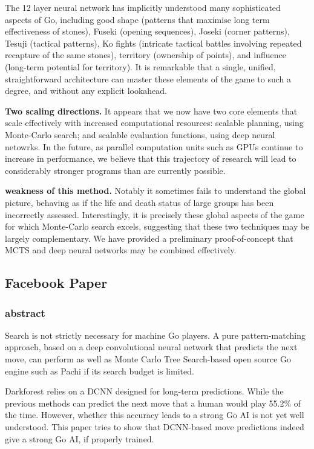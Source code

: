 The 12 layer neural network has implicitly understood many sophisticated aspects of Go, including good
shape (patterns that maximise long term effectiveness of stones), Fuseki (opening sequences), Joseki
(corner patterns), Tesuji (tactical patterns), Ko fights (intricate tactical battles involving repeated
recapture of the same stones), territory (ownership of points), and influence (long-term potential
for territory). It is remarkable that a single, unified, straightforward architecture can master these
elements of the game to such a degree, and without any explicit lookahead.

\textbf{Two scaling directions.} It appears that we now have two core elements that scale effectively with increased computational resources: scalable planning, using Monte-Carlo search; and scalable evaluation functions, using deep neural netowrks. In the future, as parallel computation units such as GPUs continue to increase in performance, we believe that this trajectory of research will lead to considerably stronger programs than are currently possible.

\textbf{weakness of this method.} Notably it sometimes fails to understand the global picture, behaving as if the life and death status of large groups has been incorrectly assessed. Interestingly, it is precisely these global aspects of the game for which Monte-Carlo search excels, suggesting that these two techniques may be largely complementary. We have provided a preliminary proof-of-concept that MCTS and deep neural networks may be combined effectively.
\subsection{Facebook Paper}
\subsubsection{abstract}
Search is not strictly necessary for machine Go players. A pure pattern-matching approach, based on a deep convolutional neural network that predicts the next move, can perform as well as Monte Carlo Tree Search-based open source Go engine such as Pachi if its search budget is limited.

Darkforest relies on a DCNN designed for long-term predictions. While the previous methods can predict the next move that a human would play 55.2\% of the time. However, whether this accuracy leads to a strong Go AI is not yet well understood. This paper tries to show that DCNN-based move predictions indeed give a strong Go AI, if properly trained.
